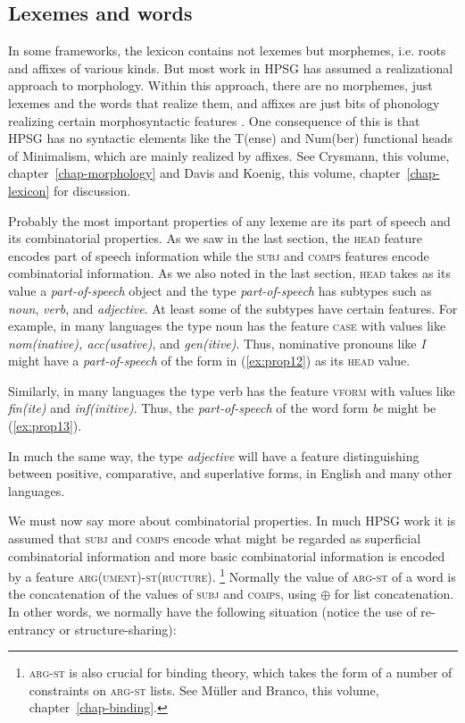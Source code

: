 \documentclass[output=paper
	        ,collection
	        ,collectionchapter
 	        ,biblatex
                ,babelshorthands
                ,newtxmath
                ,draftmode
                ,colorlinks, citecolor=brown
]{langscibook}
\begin{document}
\subsection{Lexemes and words}

In some frameworks, the lexicon contains not lexemes but morphemes, i.e. roots and affixes of various kinds. But most work in HPSG has assumed a realizational approach to morphology. Within this approach, there are no morphemes, just lexemes and the words that realize them, and affixes are just bits of phonology realizing certain morphosyntactic features \citep{Stump2001a-u-kopiert,Anderson92a-u}. One consequence of this is that HPSG has no syntactic elements like the T(ense) and Num(ber) functional heads of Minimalism, which are mainly realized by affixes. See Crysmann, this volume, chapter~\ref{chap-morphology} and Davis and Koenig, this volume, chapter~\ref{chap-lexicon} for discussion.

Probably the most important properties of any lexeme are its part of speech and its combinatorial properties. As we saw in the last section, the \textsc{head} feature encodes part of speech information while the \textsc{subj} and \textsc{comps} features encode combinatorial information. As we also noted in the last section, \textsc{head} takes as its value a \emph{part-of-speech} object and the type \emph{part-of-speech} has subtypes such as \emph{noun}, \emph{verb}, and \emph{adjective}. At least some of the subtypes have certain features. For example, in many languages the type noun has the feature \textsc{case} with values like \emph{nom(inative), acc(usative)}, and \emph{gen(itive)}. Thus, nominative pronouns like \emph{I} might have a \emph{part-of-speech} of the form in (\ref{ex:prop12}) as its \textsc{head} value.

\ea\label{ex:prop12}
\z

Similarly, in many languages the type verb has the feature \textsc{vform} with values like \emph{fin(ite)} and \emph{inf(initive)}. Thus, the \emph{part-of-speech} of the word form \emph{be} might be (\ref{ex:prop13}).

\ea\label{ex:prop13}
\z

In much the same way, the type \emph{adjective} will have a feature distinguishing between positive, comparative, and superlative forms, in English and many other languages.

We must now say more about combinatorial properties. In much HPSG work it is assumed that \textsc{subj} and \textsc{comps} encode what might be regarded as superficial combinatorial information and more basic combinatorial information is encoded by a feature \textsc{arg(ument)-st(ructure)}.%
%
\footnote{\textsc{arg-st} is also crucial for binding theory, which takes the form of a number of constraints on \textsc{arg-st} lists. See Müller and Branco, this volume, chapter~\ref{chap-binding}.}
%
Normally the value of \textsc{arg-st} of a word is the concatenation of the values of \textsc{subj} and \textsc{comps}, using $\oplus$ for list concatenation. In other words, we normally have the following situation (notice the use of re-entrancy or structure-sharing):
\end{document}
